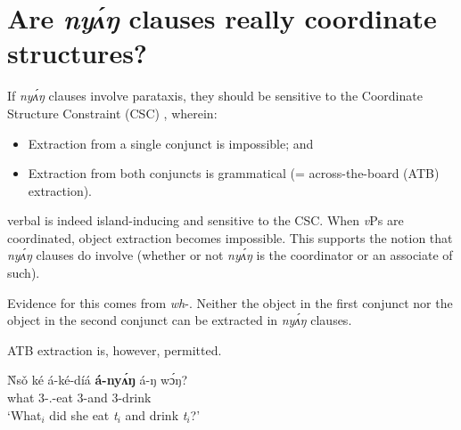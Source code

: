 \documentclass[output=paper,modfonts,nonflat,
]{langsci/langscibook}
\begin{document}
\section{Are \textit{ny\'{ʌ}ŋ} clauses really coordinate structures?}\label{sec:duncan-et-al:4}

If  \textit{ny\'{ʌ}ŋ} clauses involve parataxis, they should be sensitive to the Coordinate Structure Constraint (CSC) \citep{ross1967constraints}, wherein:

\begin{itemize}
\item Extraction from a single conjunct is impossible; and
\item Extraction from both conjuncts is grammatical (= across-the-board (ATB) extraction).
\end{itemize}

\noindent {} verbal  is indeed island-inducing and sensitive to the CSC. When \textit{v}Ps are coordinated, object extraction becomes impossible. This supports the notion that \textit{ny\'{ʌ}ŋ} clauses do involve  (whether or not \textit{ny\'{ʌ}ŋ} is the coordinator or an associate of such).

Evidence for this comes from \textit{wh}-. Neither the object in the first conjunct nor the object in the second conjunct can be extracted in \textit{ny\'{ʌ}ŋ} clauses.

\ea\label{ex:duncan-et-al:13}
\z
\z

\noindent ATB extraction is, however, permitted.

\ea\label{ex:duncan-et-al:14}
\gll \`{N}s\v{o} ké á-ké-díá \textbf{á-ny\'{ʌ}ŋ} á-ŋ w\'ɔŋ? \\
what {\FOC} 3{\SG-\PST.\FOC}-eat 3{\SG}-and 3{\SG}-drink \\
\glt `What$_i$ did she eat \textit{t}$_i$ and drink \textit{t}$_i$?'
\z
\end{document}
